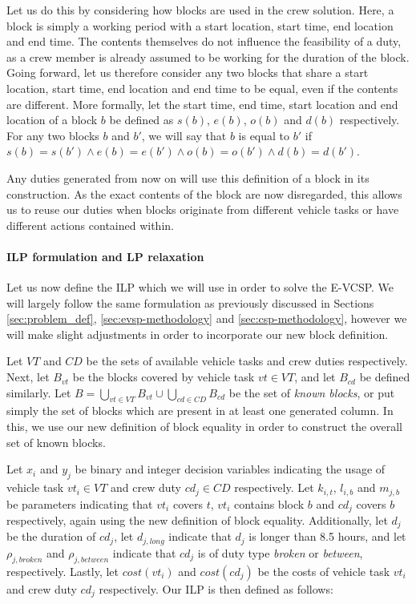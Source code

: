 \documentclass[]{article}
\begin{document}
Let us do this by considering how blocks are used in the crew solution. Here, a block is simply a working period with a start location, start time, end location and end time. The contents themselves do not influence the feasibility of a duty, as a crew member is already assumed to be working for the duration of the block. Going forward, let us therefore consider any two blocks that share a start location, start time, end location and end time to be equal, even if the contents are different. More formally, let the start time, end time, start location and end location of a block $b$ be defined as $s(b)$, $e(b)$, $o(b)$ and $d(b)$ respectively. For any two blocks $b$ and $b'$, we will say that $b$ is equal to $b'$ if $s(b) = s(b') \wedge e(b) = e(b') \wedge o(b) = o(b') \wedge d(b) = d(b')$. 

Any duties generated from now on will use this definition of a block in its construction. As the exact contents of the block are now disregarded, this allows us to reuse our duties when blocks originate from different vehicle tasks or have different actions contained within. 

\paragraph{ILP formulation and LP relaxation} Let us now define the ILP which we will use in order to solve the E-VCSP. We will largely follow the same formulation as previously discussed in Sections \ref{sec:problem_def}, \ref{sec:evsp-methodology} and \ref{sec:csp-methodology}, however we will make slight adjustments in order to incorporate our new block definition. 

Let $VT$ and $CD$ be the sets of available vehicle tasks and crew duties respectively. Next, let $B_{vt}$ be the blocks covered by vehicle task $vt \in VT$, and let $B_{cd}$ be defined similarly. Let $B = \bigcup_{vt \in VT} B_{vt} \cup \bigcup_{cd \in CD} B_{cd}$ be the set of \emph{known blocks}, or put simply the set of blocks which are present in at least one generated column. In this, we use our new definition of block equality in order to construct the overall set of known blocks. 

Let $x_i$ and $y_j$ be binary and integer decision variables indicating the usage of vehicle task $vt_i \in VT$ and crew duty $cd_j \in CD$ respectively. Let $k_{i,t}$, $l_{i,b}$ and $m_{j,b}$ be parameters indicating that $vt_i$ covers $t$, $vt_i$ contains block $b$ and $cd_j$ covers $b$ respectively, again using the new definition of block equality. Additionally, let $d_j$ be the duration of $cd_j$, let $d_{j,\textit{long}}$ indicate that $d_j$ is longer than 8.5 hours, and let $\rho_{j,\textit{broken}}$ and $\rho_{j,\textit{between}}$ indicate that $cd_j$ is of duty type \textit{broken} or \textit{between}, respectively. Lastly, let $cost(vt_i)$ and $cost(cd_j)$ be the costs of vehicle task $vt_i$ and crew duty $cd_j$ respectively. Our ILP is then defined as follows:
\end{document}
